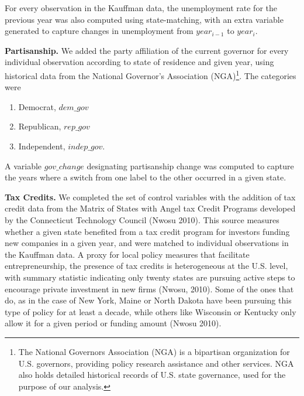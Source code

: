 For every observation in the Kauffman data, the unemployment rate for the previous year was also computed using state-matching, with an extra variable generated to capture changes in unemployment from $year_{i-1}$ to $year_{i}$. 

\textbf{Partisanship.} We added the party affiliation of the current governor for every individual observation according to state of residence and given year, using historical data from the National Governor’s Association (NGA)\footnote{The National Governors Association (NGA) is a bipartisan organization for U.S. governors, providing policy research assistance and other services. NGA also holds detailed historical records of U.S. state governance, used for the purpose of our analysis.}. The categories were 
\begin{singlespace}
\renewcommand{\labelenumi}{\roman{enumi}}
\begin{enumerate}
\item Democrat, $dem\_gov$
\item Republican, $rep\_gov$  
\item Independent, $indep\_gov$.
\end{enumerate}
\end{singlespace}
A variable $gov\_change$ designating partisanship change was computed to capture the years where a switch from one label to the other occurred in a given state. 

\textbf{Tax Credits.} We completed the set of control variables with the addition of tax credit data from the Matrix of States with Angel tax Credit Programs developed by the Connecticut Technology Council (Nwosu 2010). This source measures whether a given state benefited from a tax credit program for investors funding new companies in a given year, and were matched to individual observations in the Kauffman data. A proxy for local policy measures that facilitate entrepreneurship, the presence of tax credits is heterogeneous at the U.S. level, with summary statistic indicating only twenty states are pursuing active steps to encourage private investment in new firms (Nwosu, 2010). Some of the ones that do, as in the case of New York, Maine or North Dakota have been pursuing this type of policy for at least a decade, while others like Wisconsin or Kentucky only allow it for a given period or funding amount (Nwosu 2010). 


